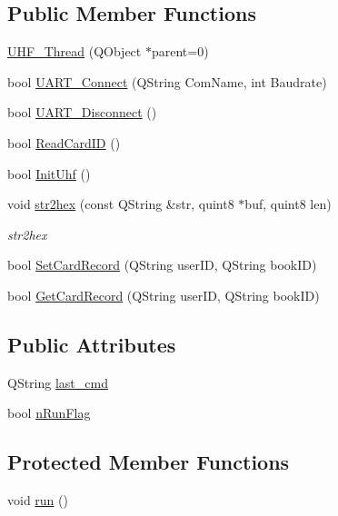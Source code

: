 \subsection*{Public Member Functions}
\begin{DoxyCompactItemize}
\item 
\mbox{\hyperlink{class_u_h_f___thread_a4e345d08f3f78642458925017371cac2}{U\+H\+F\+\_\+\+Thread}} (Q\+Object $\ast$parent=0)
\item 
bool \mbox{\hyperlink{class_u_h_f___thread_a8a872370902a9eb489a836ab28d8044c}{U\+A\+R\+T\+\_\+\+Connect}} (Q\+String Com\+Name, int Baudrate)
\item 
bool \mbox{\hyperlink{class_u_h_f___thread_a4d29770cacd38ec97148b8642df794b8}{U\+A\+R\+T\+\_\+\+Disconnect}} ()
\item 
bool \mbox{\hyperlink{class_u_h_f___thread_a6dcb8fe026e47d35c7d992b860c86492}{Read\+Card\+ID}} ()
\item 
bool \mbox{\hyperlink{class_u_h_f___thread_a0bb3c8d9ac1290986ce318819dc4ecbf}{Init\+Uhf}} ()
\item 
void \mbox{\hyperlink{class_u_h_f___thread_aa7aa23919d844f6da517ecec5747bed5}{str2hex}} (const Q\+String \&str, quint8 $\ast$buf, quint8 len)
\begin{DoxyCompactList}\small\item\em str2hex \end{DoxyCompactList}\item 
bool \mbox{\hyperlink{class_u_h_f___thread_a1ec4510fd4d722b34d6cd33c3820f897}{Set\+Card\+Record}} (Q\+String user\+ID, Q\+String book\+ID)
\item 
bool \mbox{\hyperlink{class_u_h_f___thread_af1bc225a4a6a68a1dd79eb7d8688648d}{Get\+Card\+Record}} (Q\+String user\+ID, Q\+String book\+ID)
\end{DoxyCompactItemize}
\subsection*{Public Attributes}
\begin{DoxyCompactItemize}
\item 
Q\+String \mbox{\hyperlink{class_u_h_f___thread_a04164c9431f66a3e25ea1206ac1b1adc}{last\+\_\+cmd}}
\item 
bool \mbox{\hyperlink{class_u_h_f___thread_ab40811b93c5e8b31c4f40cc79139e504}{n\+Run\+Flag}}
\end{DoxyCompactItemize}
\subsection*{Protected Member Functions}
\begin{DoxyCompactItemize}
\item 
void \mbox{\hyperlink{class_u_h_f___thread_a7ae2a5c0bae9b20e0fbc315febefb818}{run}} ()
\end{DoxyCompactItemize}


